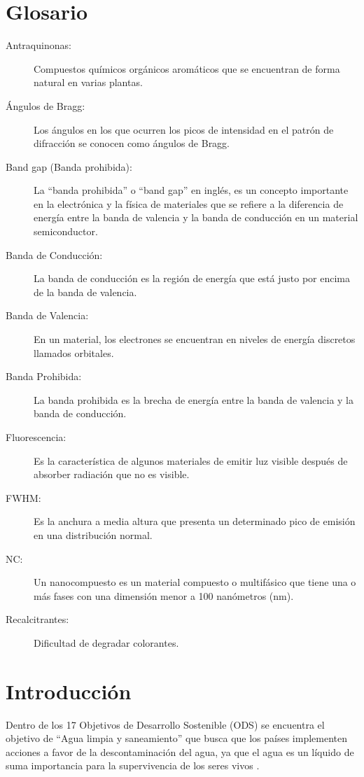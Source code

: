 \documentclass[12pt]{article}
\begin{document}
\section*{Glosario}
\begin{description}
    \item[Antraquinonas:] Compuestos químicos orgánicos aromáticos que se encuentran de forma natural en varias plantas.
    \item[Ángulos de Bragg:] Los ángulos en los que ocurren los picos de intensidad en el patrón de difracción se conocen como ángulos de Bragg.
    \item[Band gap (Banda prohibida):] La “banda prohibida” o “band gap” en inglés, es un concepto importante en la electrónica y la física de materiales que se refiere a la diferencia de energía entre la banda de valencia y la banda de conducción en un material semiconductor.
    \item[Banda de Conducción:] La banda de conducción es la región de energía que está justo por encima de la banda de valencia.
    \item[Banda de Valencia:] En un material, los electrones se encuentran en niveles de energía discretos llamados orbitales.
    \item[Banda Prohibida:] La banda prohibida es la brecha de energía entre la banda de valencia y la banda de conducción.
    \item[Fluorescencia:] Es la característica de algunos materiales de emitir luz visible después de absorber radiación que no es visible.
    \item[FWHM:] Es la anchura a media altura que presenta un determinado pico de emisión en una distribución normal.
    \item[NC:] Un nanocompuesto es un material compuesto o multifásico que tiene una o más fases con una dimensión menor a 100 nanómetros (nm).
    \item[Recalcitrantes:] Dificultad de degradar colorantes.
\end{description}
\newpage
{}  %
\section{Introducción}
Dentro de los 17 Objetivos de Desarrollo Sostenible (ODS) se encuentra el objetivo de “Agua limpia y saneamiento” que busca que los países implementen acciones a favor de la descontaminación del agua, ya que el agua es un líquido de suma importancia para la supervivencia de los seres vivos \cite{IEEEreferencias:Ref1}.
\end{document}
